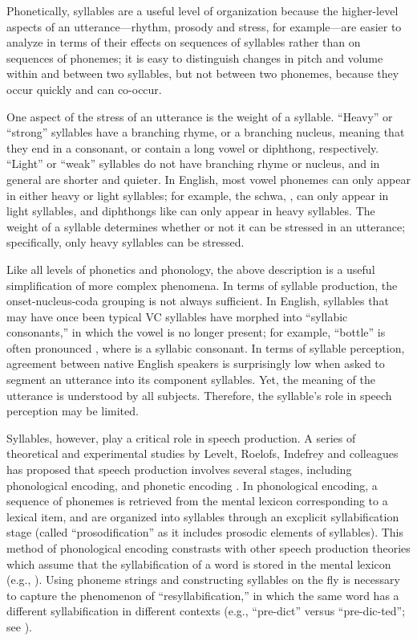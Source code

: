 Phonetically, syllables are a useful
level of organization because
the higher-level aspects
of an utterance---rhythm, prosody and stress,
for example---are easier to analyze
in terms of their effects on
sequences of syllables rather than
on sequences of phonemes;
it is easy to distinguish
changes in pitch and volume
within and between two syllables,
but not between two phonemes,
because they occur quickly
and can co-occur.

One aspect of the stress of an utterance
is the weight of a syllable.
``Heavy'' or ``strong'' syllables
have a branching rhyme,
or a branching nucleus,
meaning that they
end in a consonant,
or contain a long vowel or diphthong,
respectively.
``Light'' or ``weak'' syllables
do not have branching rhyme or nucleus,
and in general are shorter
and quieter.
In English, most vowel phonemes
can only appear in either
heavy or light syllables;
for example, the schwa, \ipa{[@]},
can only appear in light syllables,
and diphthongs like \ipa{[aU]}
can only appear in heavy syllables.
The weight of a syllable determines
whether or not it can be stressed
in an utterance;
specifically, only heavy syllables
can be stressed.

Like all levels of phonetics and phonology,
the above description is a useful simplification
of more complex phenomena.
In terms of syllable production,
the onset-nucleus-coda grouping
is not always sufficient.
In English, syllables that may have once
been typical VC syllables have morphed
into ``syllabic consonants,'' in which
the vowel is no longer present;
for example, ``bottle'' is often
pronounced \ipa{[b6tl]},
where \ipa{[l]} is a syllabic consonant.
In terms of syllable perception,
agreement between native English speakers
is surprisingly low when
asked to segment an utterance
into its component syllables.
Yet, the meaning of the utterance
is understood by all subjects.
Therefore, the syllable's
role in speech perception may be limited.

Syllables, however, play a critical role
in speech production.
A series of theoretical and experimental studies
by Levelt, Roelofs, Indefrey and colleagues
has proposed that speech production
involves several stages,
including phonological encoding,
and phonetic encoding
\citep{levelt1999,roelofs2000,cholin2004,indefrey2004,indefrey2011}.
In phonological encoding,
a sequence of phonemes is retrieved
from the mental lexicon corresponding
to a lexical item,
and are organized into syllables
through an excplicit syllabification stage
(called ``prosodification'' as it
includes prosodic elements of syllables).
This method of phonological encoding
constrasts with other speech production theories
which assume that the syllabification
of a word is stored in the mental lexicon
(e.g., \citealt{dell1988}).
Using phoneme strings and constructing
syllables on the fly
is necessary to capture
the phenomenon of ``resyllabification,''
in which the same word
has a different syllabification
in different contexts
(e.g., ``pre-dict'' versus
``pre-dic-ted'';
see \citealt{cholin2004}).

